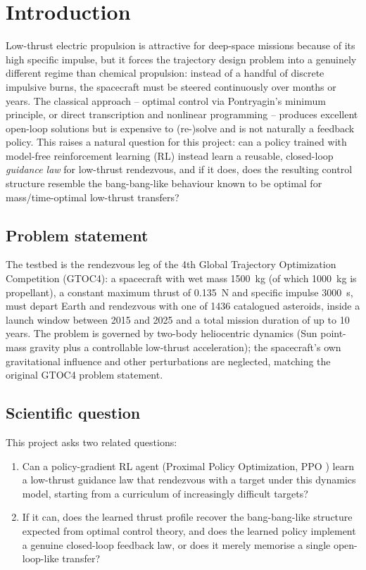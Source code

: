 \chapter{Introduction}
\label{chapter:introduction}

Low-thrust electric propulsion is attractive for deep-space missions because of its high specific
impulse, but it forces the trajectory design problem into a genuinely different regime than
chemical propulsion: instead of a handful of discrete impulsive burns, the spacecraft must be
steered continuously over months or years. The classical approach -- optimal control via
Pontryagin's minimum principle, or direct transcription and nonlinear programming -- produces
excellent open-loop solutions but is expensive to (re-)solve and is not naturally a feedback
policy. This raises a natural question for this project: can a policy trained with model-free
reinforcement learning (RL) instead learn a reusable, closed-loop \emph{guidance law} for
low-thrust rendezvous, and if it does, does the resulting control structure resemble the
bang-bang-like behaviour known to be optimal for mass/time-optimal low-thrust transfers?

\section{Problem statement}

The testbed is the rendezvous leg of the 4th Global Trajectory Optimization Competition (GTOC4):
a spacecraft with wet mass \SI{1500}{kg} (of which \SI{1000}{kg} is propellant), a constant
maximum thrust of \SI{0.135}{N} and specific impulse \SI{3000}{s}, must depart Earth and rendezvous
with one of 1436 catalogued asteroids, inside a launch window between 2015 and 2025 and a total
mission duration of up to 10 years. The problem is governed by two-body heliocentric dynamics
(Sun point-mass gravity plus a controllable low-thrust acceleration); the spacecraft's own
gravitational influence and other perturbations are neglected, matching the original GTOC4
problem statement.

\section{Scientific question}

This project asks two related questions:
\begin{enumerate}
  \item Can a policy-gradient RL agent (Proximal Policy Optimization, PPO \parencite{schulman2017ppo}) learn a low-thrust
        guidance law that rendezvous with a target under this dynamics model, starting from a
        curriculum of increasingly difficult targets?
  \item If it can, does the learned thrust profile recover the bang-bang-like structure expected
        from optimal control theory, and does the learned policy implement a genuine closed-loop
        feedback law, or does it merely memorise a single open-loop-like transfer?
\end{enumerate}

